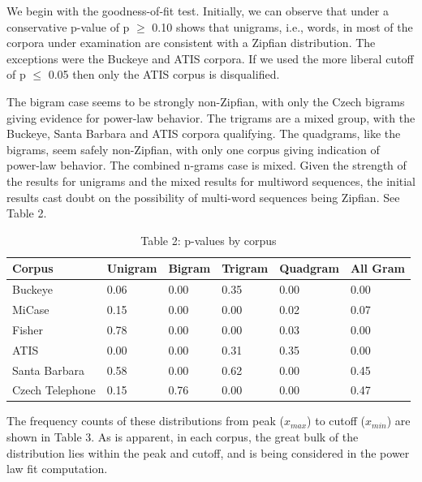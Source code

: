 \documentclass[12pt]{article}
\begin{document}
We begin with the goodness-of-fit test. Initially, we can observe that under a conservative p-value of p $\geq$ 0.10 shows that unigrams, i.e., words, in most of the corpora under examination are consistent with a Zipfian distribution. The exceptions were the Buckeye and ATIS corpora. If we used the more liberal cutoff of p $\leq$ 0.05 then only the ATIS corpus is disqualified.

The bigram case seems to be strongly non-Zipfian, with only the Czech bigrams giving evidence for power-law behavior. The trigrams are a mixed group, with the Buckeye, Santa Barbara and ATIS corpora qualifying. The quadgrams, like the bigrams, seem safely non-Zipfian, with only one corpus giving indication of power-law behavior. The combined n-grams case is mixed.  Given the strength of the results for unigrams and the mixed results for multiword sequences, the initial results cast doubt on the possibility of multi-word sequences being Zipfian. See Table 2.


\begin{table}[H]
\caption{Table 2: p-values by corpus}
\begin{center}
\begin{tabular}{ |l|l|l|l|l|l| } 
\hline
 Corpus & Unigram & Bigram & Trigram & Quadgram & All Gram\\ [0.5ex] 
 \hline
 Buckeye & 0.06 & 0.00 & 0.35 & 0.00 & 0.00 \\ 
 MiCase & 0.15 & 0.00 & 0.00 & 0.02 & 0.07\\
 Fisher & 0.78 & 0.00 & 0.00 & 0.03 & 0.00 \\ 
 ATIS & 0.00 & 0.00 & 0.31 & 0.35 & 0.00 \\
 Santa Barbara & 0.58 & 0.00 & 0.62 & 0.00 & 0.45 \\
 Czech Telephone & 0.15 & 0.76 & 0.00 & 0.00 & 0.47 \\
 \hline
\end{tabular}
\end{center}
\end{table}

The frequency counts of these distributions from peak ($x_{max}$) to cutoff ($x_{min}$) are shown in Table 3. As is apparent, in each corpus, the great bulk of the distribution lies within the peak and cutoff, and is being considered in the power law fit computation.
\end{document}
